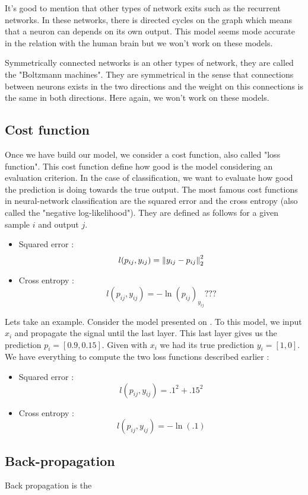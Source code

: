 		It's good to mention that other types of network exits such as the recurrent networks. In these networks, there is directed cycles on the graph which means that a neuron can depends on its own output. This model seems mode accurate in the relation with the human brain but we won't work on these models.

		Symmetrically connected networks is an other types of network, they are called the "Boltzmann machines". They are symmetrical in the sense that connections between neurons exists in the two directions and the weight on this connections is the same in both directions. Here again, we won't work on these models.


	

	\subsection{Cost function}
		Once we have build our model, we consider a cost function, also called "loss function". This cost function define how good is the model considering an evaluation criterion. In the case of classification, we want to evaluate how good the prediction is doing towards the true output.
		The most famous cost functions in neural-network classification are the squared error and the cross entropy (also called the "negative log-likelihood"). They are defined as follows for a given sample $i$ and output $j$.
		\begin{itemize}
			\item Squared error : $$ l(p_{ij},y_{ij}) = \left\lVert y_{ij} - p_{ij}\right\rVert_2^2 $$
			\item Cross entropy : $$ l(p_{ij},y_{ij}) = -\ln(p_{ij})_{y_{ij}}  ??? $$ 
		\end{itemize}

		Lets take an example. Consider the model presented on . To this model, we input $x_i$ and propagate the signal until the last layer. This last layer gives us the prediction $p_i = [0.9,0.15]$. Given with $x_i$ we had its true prediction $y_i = [1,0]$. We have everything to compute the two loss functions described earlier : 
		\begin{itemize}
			\item Squared error : $$ l(p_{ij},y_{ij}) =  .1^2 + .15^2 $$
			\item Cross entropy : $$ l(p_{ij},y_{ij}) = -\ln(.1)  $$
		\end{itemize}


	\subsection{Back-propagation}
		Back propagation is the 


